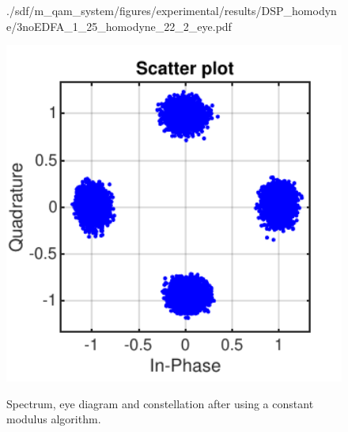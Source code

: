 \begin{figure}[H]
\begin{minipage}{0.30\textwidth}
			{./sdf/m_qam_system/figures/experimental/results/DSP_homodyne/3noEDFA_1_25_homodyne_22_2_eye.pdf}
			\label{fig:1250MBdSpecMF}
		\end{minipage}
		\begin{minipage}{0.30\textwidth}
			\centering
			\includegraphics[width=1\textwidth]
			{./sdf/m_qam_system/figures/experimental/results/DSP_homodyne/3noEDFA_1_25_homodyne_22_2_const.pdf}\\
			\label{fig:1250MBdSpecBefFec}
		\end{minipage}
		\caption{Spectrum, eye diagram and constellation after using a constant modulus
		algorithm.}
		\label{fig:1250MBMFHm}
	\end{figure}


